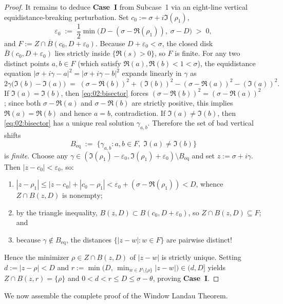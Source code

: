 \begin{proof}
It remains to deduce \textbf{Case~I} from Subcase~1 via an eight-line vertical equidistance-breaking perturbation. Set $c_0 := \sigma + i\Im(\rho_1)$,
\[
  \varepsilon_0 \;:=\; \frac{1}{2}\min\!\bigl(D - (\sigma - \Re(\rho_1)),\; \sigma - D\bigr) \;>\; 0,
\]
and $F := Z \cap \overline{B}(c_0, D + \varepsilon_0)$. Because $D + \varepsilon_0 < \sigma$, the closed disk $\overline{B}(c_0, D + \varepsilon_0)$ lies strictly inside $\{\Re(s) > 0\}$, so $F$ is finite. For any two distinct points $a, b \in F$ (which satisfy $\Re(a), \Re(b) < 1 < \sigma$), the equidistance equation $|\sigma + i\gamma - a|^2 = |\sigma + i\gamma - b|^2$ expands linearly in $\gamma$ as
\begin{equation}
\label{eq:02:bisector}
  2\gamma\bigl(\Im(b) - \Im(a)\bigr) \;=\; (\sigma - \Re(b))^2 + (\Im(b))^2 - (\sigma - \Re(a))^2 - (\Im(a))^2.
\end{equation}
If $\Im(a) = \Im(b)$, then \eqref{eq:02:bisector} forces $(\sigma - \Re(b))^2 = (\sigma - \Re(a))^2$; since both $\sigma - \Re(a)$ and $\sigma - \Re(b)$ are strictly positive, this implies $\Re(a) = \Re(b)$ and hence $a = b$, contradiction. If $\Im(a) \neq \Im(b)$, then \eqref{eq:02:bisector} has a unique real solution $\gamma_{a,b}$. Therefore the set of bad vertical shifts
\[
  B_{\mathrm{eq}} \;:=\; \bigl\{\gamma_{a,b} : a, b \in F,\; \Im(a) \neq \Im(b)\bigr\}
\]
is \emph{finite}. Choose any $\gamma \in (\Im(\rho_1) - \varepsilon_0, \Im(\rho_1) + \varepsilon_0) \setminus B_{\mathrm{eq}}$ and set $z := \sigma + i\gamma$. Then $|z - c_0| < \varepsilon_0$, so:
\begin{enumerate}[label=(\alph*)]
\item $|z - \rho_1| \le |z - c_0| + |c_0 - \rho_1| < \varepsilon_0 + (\sigma - \Re(\rho_1)) < D$, whence $Z \cap B(z, D)$ is nonempty;
\item by the triangle inequality, $B(z, D) \subset B(c_0, D + \varepsilon_0)$, so $Z \cap B(z, D) \subseteq F$; and
\item because $\gamma \notin B_{\mathrm{eq}}$, the distances $\{|z - w| : w \in F\}$ are pairwise distinct!
\end{enumerate}
Hence the minimizer $\rho \in Z \cap B(z, D)$ of $|z - w|$ is strictly unique. Setting $d := |z - \rho| < D$ and $r := \min\bigl(D,\, \min_{w \in F \setminus \{\rho\}} |z - w|\bigr) \in (d, D]$ yields $Z \cap B(z, r) = \{\rho\}$ and $0 < d < r \le D \le \sigma - \theta$, proving \textbf{Case~I}.
\end{proof}

We now assemble the complete proof of the Window Landau Theorem.

